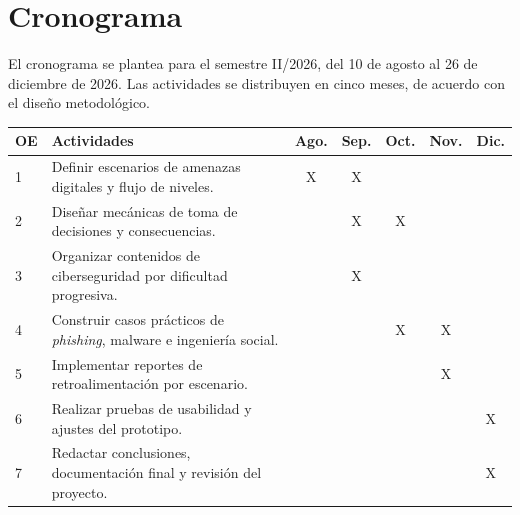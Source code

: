 \section{Cronograma}

El cronograma se plantea para el semestre II/2026, del 10 de agosto al 26 de diciembre de 2026. Las actividades se distribuyen en cinco meses, de acuerdo con el diseño metodológico.

\small
\begin{tabularx}{\textwidth}{|p{}|X|c|c|c|c|c|}
\hline
\textbf{OE} & \textbf{Actividades} & \textbf{Ago.} & \textbf{Sep.} & \textbf{Oct.} & \textbf{Nov.} & \textbf{Dic.} \\
\hline
1 & Definir escenarios de amenazas digitales y flujo de niveles. & X & X & & & \\
\hline
2 & Diseñar mecánicas de toma de decisiones y consecuencias. & & X & X & & \\
\hline
3 & Organizar contenidos de ciberseguridad por dificultad progresiva. & & X & & & \\
\hline
4 & Construir casos prácticos de \textit{phishing}, malware e ingeniería social. & & & X & X & \\
\hline
5 & Implementar reportes de retroalimentación por escenario. & & & & X & \\
\hline
6 & Realizar pruebas de usabilidad y ajustes del prototipo. & & & & & X \\
\hline
7 & Redactar conclusiones, documentación final y revisión del proyecto. & & & & & X \\
\hline
\end{tabularx}
\normalsize
